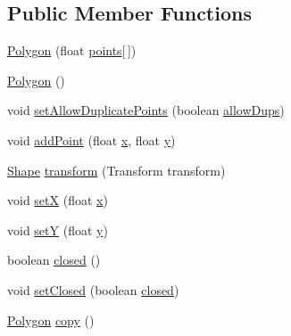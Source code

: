 \subsection*{Public Member Functions}
\begin{DoxyCompactItemize}
\item 
\mbox{\hyperlink{classorg_1_1newdawn_1_1slick_1_1geom_1_1_polygon_a3915cd4602383603e34b48c4b71d7a0a}{Polygon}} (float \mbox{\hyperlink{classorg_1_1newdawn_1_1slick_1_1geom_1_1_shape_a8b4d4058734bbb3b96072e470b92aa37}{points}}\mbox{[}$\,$\mbox{]})
\item 
\mbox{\hyperlink{classorg_1_1newdawn_1_1slick_1_1geom_1_1_polygon_aae353d8c33cff787d8ae535036551489}{Polygon}} ()
\item 
void \mbox{\hyperlink{classorg_1_1newdawn_1_1slick_1_1geom_1_1_polygon_a5e745ea14644224278b2d66a313db704}{set\+Allow\+Duplicate\+Points}} (boolean \mbox{\hyperlink{classorg_1_1newdawn_1_1slick_1_1geom_1_1_polygon_a425e8151c71ea31ba03f5d147f9ef79a}{allow\+Dups}})
\item 
void \mbox{\hyperlink{classorg_1_1newdawn_1_1slick_1_1geom_1_1_polygon_a62d22ea48361fe38f8868f1f126a7b7a}{add\+Point}} (float \mbox{\hyperlink{classorg_1_1newdawn_1_1slick_1_1geom_1_1_shape_a3e985bfff386c15a4efaad03d8ad60d3}{x}}, float \mbox{\hyperlink{classorg_1_1newdawn_1_1slick_1_1geom_1_1_shape_a9f934baded6a1b65ebb69e7e5f80ea00}{y}})
\item 
\mbox{\hyperlink{classorg_1_1newdawn_1_1slick_1_1geom_1_1_shape}{Shape}} \mbox{\hyperlink{classorg_1_1newdawn_1_1slick_1_1geom_1_1_polygon_ae03273cea4a8bb9f5be71af4bc1c0c8a}{transform}} (Transform transform)
\item 
void \mbox{\hyperlink{classorg_1_1newdawn_1_1slick_1_1geom_1_1_polygon_a9a974909df2106f648e7588b2e288c77}{setX}} (float \mbox{\hyperlink{classorg_1_1newdawn_1_1slick_1_1geom_1_1_shape_a3e985bfff386c15a4efaad03d8ad60d3}{x}})
\item 
void \mbox{\hyperlink{classorg_1_1newdawn_1_1slick_1_1geom_1_1_polygon_af81dc676f1b6712b98dcaf0a065571f6}{setY}} (float \mbox{\hyperlink{classorg_1_1newdawn_1_1slick_1_1geom_1_1_shape_a9f934baded6a1b65ebb69e7e5f80ea00}{y}})
\item 
boolean \mbox{\hyperlink{classorg_1_1newdawn_1_1slick_1_1geom_1_1_polygon_a8ca548fdf2452ba39c43fe3ba20b9ee8}{closed}} ()
\item 
void \mbox{\hyperlink{classorg_1_1newdawn_1_1slick_1_1geom_1_1_polygon_a3dcb8dc9ee8f7309d29583aa7730cffb}{set\+Closed}} (boolean \mbox{\hyperlink{classorg_1_1newdawn_1_1slick_1_1geom_1_1_polygon_abd01891f359ce8a9cb220f8b2b905deb}{closed}})
\item 
\mbox{\hyperlink{classorg_1_1newdawn_1_1slick_1_1geom_1_1_polygon}{Polygon}} \mbox{\hyperlink{classorg_1_1newdawn_1_1slick_1_1geom_1_1_polygon_aa88a422eaf9d7493b359aea5687aad78}{copy}} ()
\end{DoxyCompactItemize}
